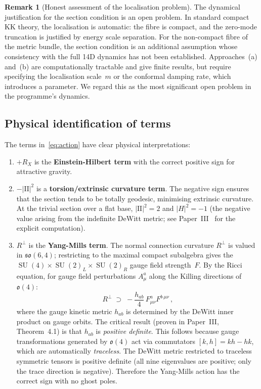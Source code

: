 \documentclass[12pt,a4paper]{article}
\theoremstyle{definition}
\newtheorem{remark}[theorem]{Remark}
\newcommand{\SU}{\operatorname{SU}}
\begin{document}
\begin{remark}[Honest assessment of the localisation problem]
\label{rem:localisation}
The dynamical justification for the section condition is an open problem.
In standard compact KK theory, the localisation is automatic: the fibre is compact, and the zero-mode truncation is justified by energy scale separation.
For the non-compact fibre of the metric bundle, the section condition is an additional assumption whose consistency with the full 14D dynamics has not been established.
Approaches~(a) and~(b) are computationally tractable and give finite results, but require specifying the localisation scale~$m$ or the conformal damping rate, which introduces a parameter.
We regard this as the most significant open problem in the programme's dynamics.
\end{remark}

\subsection{Physical identification of terms}

The terms in~\eqref{eq:action} have clear physical interpretations:

\begin{enumerate}
\item $+R_X$ is the \textbf{Einstein-Hilbert term} with the correct positive sign for attractive gravity.

\item $-|\mathrm{I\!I}|^2$ is a \textbf{torsion/extrinsic curvature term}. The negative sign ensures that the section tends to be totally geodesic, minimising extrinsic curvature.
At the trivial section over a flat base, $|\mathrm{I\!I}|^2 = 2$ and $|H|^2 = -1$ (the negative value arising from the indefinite DeWitt metric; see Paper~III~\cite{Paper3} for the explicit computation).

\item $R^\perp$ is the \textbf{Yang-Mills term}. The normal connection curvature $R^\perp$ is valued in $\mathfrak{so}(6,4)$; restricting to the maximal compact subalgebra gives the $\SU(4) \times \SU(2)_L \times \SU(2)_R$ gauge field strength~$F$.
By the Ricci equation, for gauge field perturbations $A^a_\mu$ along the Killing directions of $\mathfrak{o}(4)$:
\begin{equation}
R^\perp \;\supset\; -\frac{h_{ab}}{4}\, F^a_{\mu\nu} F^{b\,\mu\nu}\,,
\end{equation}
where the gauge kinetic metric $h_{ab}$ is determined by the DeWitt inner product on gauge orbits.
The critical result (proven in Paper~III, Theorem~4.1) is that $h_{ab}$ is \emph{positive definite}.
This follows because gauge transformations generated by $\mathfrak{o}(4)$ act via commutators $[k, h] = kh - hk$, which are automatically \emph{traceless}.
The DeWitt metric restricted to traceless symmetric tensors is positive definite (all nine eigenvalues are positive; only the trace direction is negative).
Therefore the Yang-Mills action has the correct sign with no ghost poles.
\end{enumerate}
\end{document}
